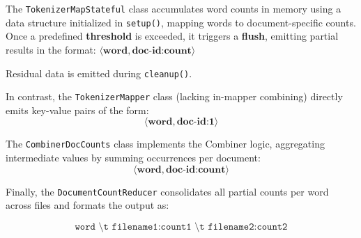 The \texttt{TokenizerMapStateful} class accumulates word counts in memory using a data structure initialized in \texttt{setup()}, mapping words to document-specific counts. Once a predefined \textbf{threshold} is exceeded, it triggers a \textbf{flush}, emitting partial results in the format: $\langle \textbf{word}, \textbf{doc-id:count} \rangle$

Residual data is emitted during \texttt{cleanup()}.

In contrast, the \texttt{TokenizerMapper} class (lacking in-mapper combining) directly emits key-value pairs of the form:
\[
\langle \textbf{word}, \textbf{doc-id:1} \rangle
\]

The \texttt{CombinerDocCounts} class implements the Combiner logic, aggregating intermediate values by summing occurrences per document:
\[
\langle \textbf{word}, \textbf{doc-id:count} \rangle
\]

Finally, the \texttt{DocumentCountReducer} consolidates all partial counts per word across files and formats the output as:

\[
\texttt{word \textbackslash t filename1:count1 \textbackslash t filename2:count2}
\]
